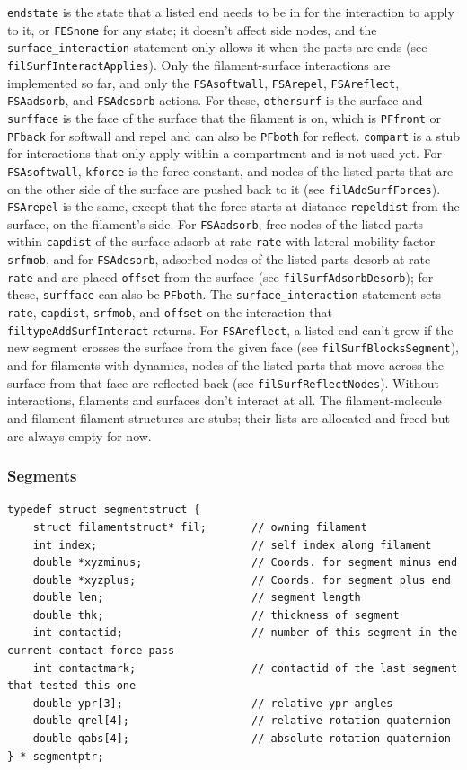 \documentclass {scrbook}
\newcommand {\ttt} {\texttt}
\begin{document}
\ttt{endstate} is the state that a listed end needs to be in for the interaction to apply to it, or \ttt{FESnone} for any state; it doesn't affect side nodes, and the \ttt{surface\_interaction} statement only allows it when the parts are ends (see \ttt{filSurfInteractApplies}). Only the filament-surface interactions are implemented so far, and only the \ttt{FSAsoftwall}, \ttt{FSArepel}, \ttt{FSAreflect}, \ttt{FSAadsorb}, and \ttt{FSAdesorb} actions. For these, \ttt{othersurf} is the surface and \ttt{surfface} is the face of the surface that the filament is on, which is \ttt{PFfront} or \ttt{PFback} for softwall and repel and can also be \ttt{PFboth} for reflect. \ttt{compart} is a stub for interactions that only apply within a compartment and is not used yet. For \ttt{FSAsoftwall}, \ttt{kforce} is the force constant, and nodes of the listed parts that are on the other side of the surface are pushed back to it (see \ttt{filAddSurfForces}). \ttt{FSArepel} is the same, except that the force starts at distance \ttt{repeldist} from the surface, on the filament's side. For \ttt{FSAadsorb}, free nodes of the listed parts within \ttt{capdist} of the surface adsorb at rate \ttt{rate} with lateral mobility factor \ttt{srfmob}, and for \ttt{FSAdesorb}, adsorbed nodes of the listed parts desorb at rate \ttt{rate} and are placed \ttt{offset} from the surface (see \ttt{filSurfAdsorbDesorb}); for these, \ttt{surfface} can also be \ttt{PFboth}. The \ttt{surface\_interaction} statement sets \ttt{rate}, \ttt{capdist}, \ttt{srfmob}, and \ttt{offset} on the interaction that \ttt{filtypeAddSurfInteract} returns. For \ttt{FSAreflect}, a listed end can't grow if the new segment crosses the surface from the given face (see \ttt{filSurfBlocksSegment}), and for filaments with dynamics, nodes of the listed parts that move across the surface from that face are reflected back (see \ttt{filSurfReflectNodes}). Without interactions, filaments and surfaces don't interact at all. The filament-molecule and filament-filament structures are stubs; their lists are allocated and freed but are always empty for now.

\subsubsection{Segments}

\begin{lstlisting}
typedef struct segmentstruct {
    struct filamentstruct* fil;       // owning filament
    int index;                        // self index along filament
    double *xyzminus;                 // Coords. for segment minus end
    double *xyzplus;                  // Coords. for segment plus end
    double len;                       // segment length
    double thk;                       // thickness of segment
    int contactid;                    // number of this segment in the current contact force pass
    int contactmark;                  // contactid of the last segment that tested this one
    double ypr[3];                    // relative ypr angles
    double qrel[4];                   // relative rotation quaternion
    double qabs[4];                   // absolute rotation quaternion
} * segmentptr;
\end{lstlisting}
\end{document}

